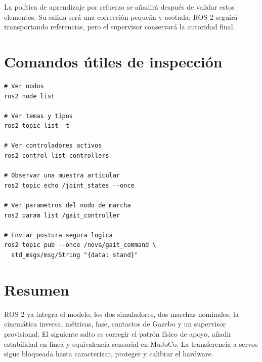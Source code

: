 \documentclass[11pt,a4paper]{article}
\begin{document}
La política de aprendizaje por refuerzo se añadirá después de validar estos
elementos. Su salida será una corrección pequeña y acotada; ROS 2 seguirá
transportando referencias, pero el supervisor conservará la autoridad final.

\section{Comandos útiles de inspección}
\begin{lstlisting}[style=terminal]
# Ver nodos
ros2 node list

# Ver temas y tipos
ros2 topic list -t

# Ver controladores activos
ros2 control list_controllers

# Observar una muestra articular
ros2 topic echo /joint_states --once

# Ver parametros del nodo de marcha
ros2 param list /gait_controller

# Enviar postura segura logica
ros2 topic pub --once /nova/gait_command \
  std_msgs/msg/String "{data: stand}"
\end{lstlisting}

\section{Resumen}
ROS 2 ya integra el modelo, los dos simuladores, dos marchas nominales, la
cinemática inversa, métricas, fase, contactos de Gazebo y un supervisor
provisional. El siguiente salto es corregir el patrón físico de apoyo, añadir
estabilidad en línea y equivalencia sensorial en MuJoCo. La transferencia a
servos sigue bloqueada hasta caracterizar, proteger y calibrar el hardware.
\end{document}
